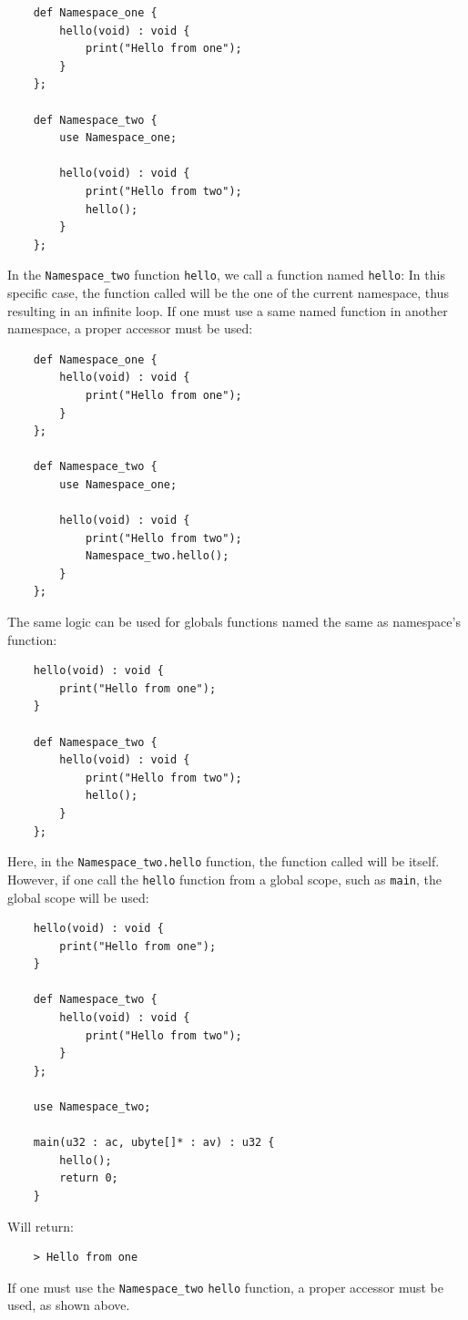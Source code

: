 \documentclass{scrartcl}
\begin{document}
            \begin{lstlisting}
    def Namespace_one {
        hello(void) : void {
            print("Hello from one");
        }
    };

    def Namespace_two {
        use Namespace_one;

        hello(void) : void {
            print("Hello from two");
            hello();
        }
    };
            \end{lstlisting}
            In the \texttt{Namespace\_two} function \texttt{hello}, we call a
            function named \texttt{hello}: In this specific case, the function
            called will be the one of the current namespace, thus resulting in
            an infinite loop. If one must use a same named function in another
            namespace, a proper accessor must be used:
            \begin{lstlisting}
    def Namespace_one {
        hello(void) : void {
            print("Hello from one");
        }
    };

    def Namespace_two {
        use Namespace_one;

        hello(void) : void {
            print("Hello from two");
            Namespace_two.hello();
        }
    };

            \end{lstlisting}
            The same logic can be used for globals functions named the same as
            namespace's function:
            \begin{lstlisting}
    hello(void) : void {
        print("Hello from one");
    }

    def Namespace_two {
        hello(void) : void {
            print("Hello from two");
            hello();
        }
    };
            \end{lstlisting}
            Here, in the \texttt{Namespace\_two.hello} function, the function
            called will be itself. However, if one call the \texttt{hello} function
            from a global scope, such as \texttt{main}, the global scope will be used:
            \begin{lstlisting}
    hello(void) : void {
        print("Hello from one");
    }

    def Namespace_two {
        hello(void) : void {
            print("Hello from two");
        }
    };

    use Namespace_two;

    main(u32 : ac, ubyte[]* : av) : u32 {
        hello();
        return 0;
    }
            \end{lstlisting}
    Will return:
            \begin{lstlisting}
    > Hello from one
            \end{lstlisting}
            If one must use the \texttt{Namespace\_two} \texttt{hello} function,
            a proper accessor must be used, as shown above.
\end{document}
